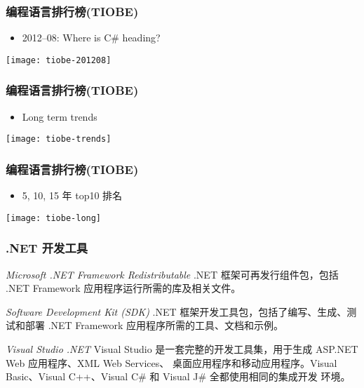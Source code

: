 \begin{frame}
\frametitle{编程语言排行榜(TIOBE)}
\begin{itemize}
\item 2012--08: Where is C\# heading?
\end{itemize}

\centering\texttt{[image: tiobe-201208]}

\end{frame}

\begin{frame}
\frametitle{编程语言排行榜(TIOBE)}
\begin{itemize}
\item Long term trends
\end{itemize}

\centering\texttt{[image: tiobe-trends]}

\end{frame}

\begin{frame}
\frametitle{编程语言排行榜(TIOBE)}
\begin{itemize}
\item 5, 10, 15 年 top10 排名
\end{itemize}

\centering \texttt{[image: tiobe-long]}

\end{frame}

\begin{frame}
\frametitle{.NET 开发工具}

\begin{exampleblock}{\textit{Microsoft .NET Framework Redistributable}}
  \CJKindent .NET 框架可再发行组件包，包括 .NET Framework 应用程序运行所需的库及相关文件。
\end{exampleblock}
\pause
\begin{exampleblock}{\textit{Software Development Kit (SDK)}}
  \CJKindent .NET 框架开发工具包，包括了编写、生成、测试和部署 .NET Framework 应用程序所需的工具、文档和示例。
\end{exampleblock}
\pause
\begin{block}{\textit{Visual Studio .NET}}
  \CJKindent Visual Studio 是一套完整的开发工具集，用于生成 ASP.NET Web 应用程序、XML Web Services、
  桌面应用程序和移动应用程序。Visual Basic、Visual C++、Visual C\# 和 Visual J\# 全都使用相同的集成开发
  环境。
\end{block}

\end{frame}

